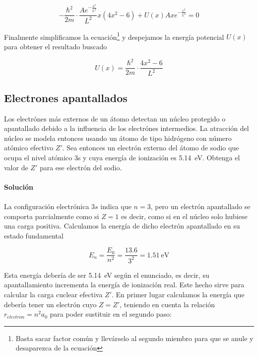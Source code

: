 \documentclass[12pt, a4paper]{article}
\begin{document}
    $$-\frac{\hbar^2}{2m}\cdot\frac{A e^{-\frac{x^2}{L^2}}}{L^2} x (4x^2-6) + U(x) A x e^{-\frac{x^2}{L^2}} = 0$$

    Finalmente simplificamos la ecuación\footnote{Basta sacar factor común y llevárselo al segundo miembro
    para que se anule y desaparezca de la ecuación}
    y despejamos la energía potencial $U(x)$ para obtener el resultado buscado

    $$U(x)=\frac{\hbar^2}{2m}\cdot\frac{4x^2-6}{L^2}$$






    \subsection{Electrones apantallados}
    Los electrónes más externos de un átomo detectan un núcleo protegido o apantallado
    debido a la influencia de los electrónes intermedios. La atracción del núcleo se modela
    entonces usando un átomo de tipo hidrógeno con número atómico efectivo $Z'$. Sea entonces
    un electrón externo del átomo de sodio que ocupa el nivel atómico 3s y cuya energía
    de ionización es \SI{5.14}{\electronvolt}. Obtenga el valor de $Z'$ para ese electrón del sodio.

    \paragraph{\textbf{Solución}}

    \paragraph{} La configuración electrónica $3s$ indica que $n=3$, pero un electrón apantallado se comporta
    parcialmente como si $Z=1$ es decir, como si en el núcleo solo hubiese una carga positiva. Calculamos
    la energía de dicho electrón apantallado en su estado fundamental

    $$E_n = \frac{E_0}{n^2} = \frac{\num{13.6}}{3^2} = \SI{1.51}{\electronvolt}$$

    Esta energía debería de ser \SI{5.14}{\electronvolt} según el enunciado, es decir,
    su apantallamiento incrementa la energía de ionización real. Este hecho sirve
    para calcular la carga cuclear efectiva $Z'$. En primer lugar calculamos la
    energía que debería tener un electrón cuyo $Z = Z'$, teniendo en cuenta la relación
    $r_{electr\acute{o}n} = n^2 a_0$ para poder sustituir en el segundo paso:
\end{document}
